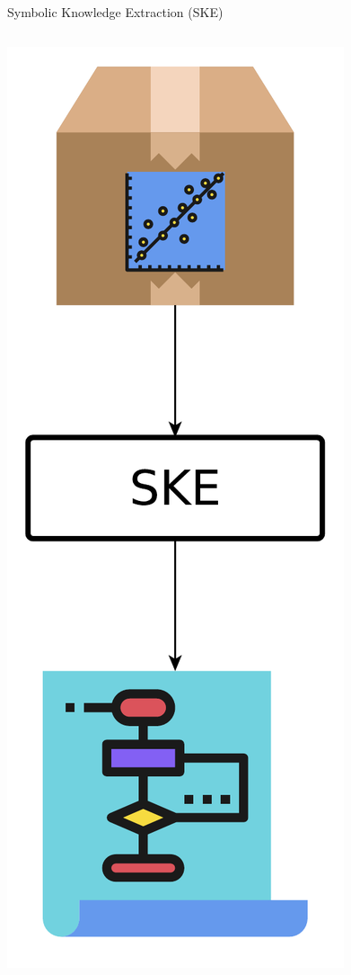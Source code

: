 \documentclass[presentation]{beamer}\mode<presentation>{\usetheme{AMSBolognaFC}}
\begin{document}
\begin{frame}[allowframebreaks]{Symbolic Knowledge Extraction (SKE)}
    \begin{columns}
        \begin{column}{0.19\linewidth}
            \includegraphics[width=\linewidth]{figures/ske.pdf}

\end{column}
\end{columns}
\end{frame}
\end{document}

